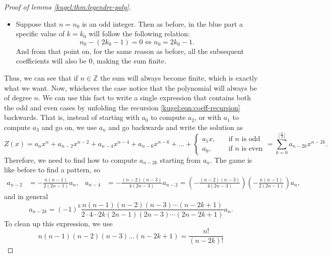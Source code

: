 \begin{proof}[Proof of lemma \ref{kugel:thm:legendre-poly}]
\begin{itemize}
    \item[\textcolor{blue}{\textbullet}]
      Suppose that $n=n_0$ is an odd integer. Then as before, in the blue part a
      specific value of $k=k_0$ will follow the following relation:
      \begin{equation*}
        n_0-(2k_0-1)=0
        \iff
        n_0 = 2k_0 - 1.
      \end{equation*}
      And from that point on, for the same reason as before, all the subsequent
      coefficients will also be 0, making the sum finite.
  \end{itemize} 

  Thus, we can see that if $n \in \mathbb{Z}$ the sum will always become finite,
  which is exactly what we want. Now, whichever the case notice that the
  polynomial will always be of degree $n$. We can use this fact to write a
  single expression that contains both the odd and even cases by unfolding the
  recursion \eqref{kugel:eqn:coeff-recursion} backwards. That is, instead of
  starting with $a_0$ to compute $a_2$, or with $a_1$ to compute $a_3$ and go
  on, we use $a_n$ and go backwards and write the solution as
  \begin{equation*}
    Z(x) = a_n x^n + a_{n-2} x^{n-2} + a_{n-4} x^{n-4} 
      + a_{n-6} x^{n-6} + \hdots +
      \begin{cases} 
        a_1 x, \quad &\text{if } n \text{ is odd} \\ 
        a_0, \quad  &\text{if } n \text{ is even} 
      \end{cases}
      = \sum_{k=0}^{\lfloor \frac{n}{2} \rfloor} a_{n-2k}x^{n-2k}.
  \end{equation*}
  Therefore, we need to find how to compute $a_{n - 2k}$ starting from $a_n$.
  The game is like before to find a pattern, so
  \begin{align*}
    a_{n-2} &= -\frac{n(n-1)}{2(2n-1)}a_n, &
    a_{n-4} &= -\frac{(n-2)(n-3)}{4(2n-3)}a_{n-2}
    = \left(
        -\frac{(n-2)(n-3)}{4(2n-3)}
      \right) \left(
        -\frac{n(n-1)}{2(2n-1)}
      \right) a_n,
  \end{align*}
  and in general 
  \begin{equation*}
    a_{n-2k} = (-1)^k \frac{
      n(n-1)(n-2)(n-3) \cdots (n-2k+1)
    }{
      2 \cdot 4 \cdots 2k(2n-1)(2n-3) \cdots (2n-2k+1)
    } a_n.
  \end{equation*}
  To clean up this expression, we use
  \begin{equation*}
    n(n-1)(n-2)(n-3) \hdots (n-2k+1)
    = \frac{n!}{(n-2k)!}

\end{equation*}
\end{proof}
